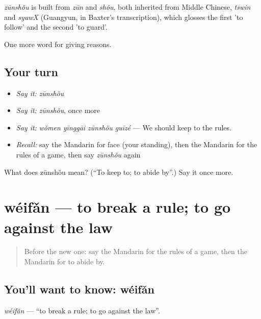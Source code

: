 \begin{cousinweb}
\emph{zūnshǒu} is built from \emph{zūn} and \emph{shǒu}, both inherited from Middle Chinese, \emph{tswin} and \emph{syuwX} (Guangyun, in Baxter's transcription), which glosses the first 'to follow' and the second 'to guard'.
\end{cousinweb}

\begin{grammarlens}[title={What you've built}]
One more word for giving reasons.
\end{grammarlens}

\subsection*{Your turn}
\begin{itemize}
\raggedright
  \item \emph{Say it:} \emph{zūnshǒu}
  \item \emph{Say it:} \emph{zūnshǒu}, once more
  \item \emph{Say it:} \emph{wǒmen yīnggāi zūnshǒu guīzé} — We should keep to the rules.
  \item \emph{Recall:} say the Mandarin for face (your standing), then the Mandarin for the rules of a game, then say \emph{zūnshǒu} again
\end{itemize}

\begin{tcolorbox}[breakable,colback=teal!4,colframe=teal!35!black,title={Before you move on}]
What does zūnshǒu mean? (\textquotedblleft{}To keep to; to abide by\textquotedblright{}.) Say it once more.
\end{tcolorbox}
\section[wéifǎn]{wéifǎn — to break a rule; to go against the law}

\label{lesson:ZH-C359-weifan}



\begin{quote}
Before the new one: say the Mandarin for the rules of a game, then the Mandarin for to abide by.
\end{quote}

\subsection*{You'll want to know: wéifǎn}
\emph{wéifǎn} — \textquotedblleft{}to break a rule; to go against the law\textquotedblright{}.

